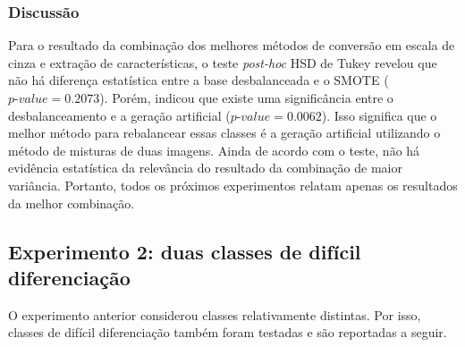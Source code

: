 \FloatBarrier
\subsubsection{Discussão}


Para o resultado da combinação dos melhores métodos de conversão em escala de cinza e extração de características, o teste \textit{post-hoc} HSD de Tukey revelou que não há diferença estatística entre a base desbalanceada e o SMOTE ($\textit{p-value} = 0.2073$). Porém, indicou que existe uma significância entre o desbalanceamento e a geração artificial ($\textit{p-value} = 0.0062$). Isso significa que o melhor método para rebalancear essas classes é a geração artificial utilizando o método de misturas de duas imagens. Ainda de acordo com o teste, não há evidência estatística da relevância do resultado da combinação de maior variância. Portanto, todos os próximos experimentos relatam apenas os resultados da melhor combinação.

\subsection{Experimento 2: duas classes de difícil diferenciação}

O experimento anterior considerou classes relativamente distintas. Por isso, classes de difícil diferenciação também foram testadas e são reportadas a seguir.

